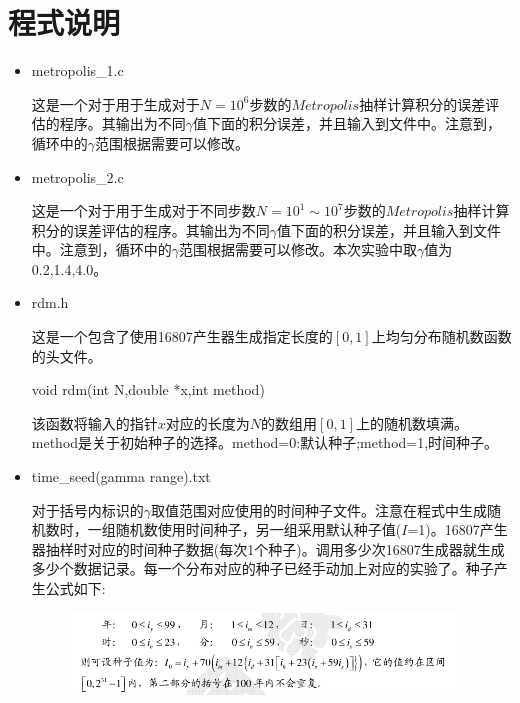 \documentclass[UTF8]{ctexart}
\begin{document}
	\section{程式说明}
	
		\begin{itemize}
			\item metropolis\_1.c
			
			这是一个对于用于生成对于$N=10^{6}$步数的$Metropolis$抽样计算积分的误差评估的程序。其输出为不同$\gamma$值下面的积分误差，并且输入到文件中。注意到，循环中的$\gamma$范围根据需要可以修改。
			
			\item metropolis\_2.c
			
			这是一个对于用于生成对于不同步数$N=10^{1}\sim10^{7}$步数的$Metropolis$抽样计算积分的误差评估的程序。其输出为不同$\gamma$值下面的积分误差，并且输入到文件中。注意到，循环中的$\gamma$范围根据需要可以修改。本次实验中取$\gamma$值为0.2,1.4,4.0。
			
			
			\item rdm.h
			
			这是一个包含了使用16807产生器生成指定长度的$[0,1]$上均匀分布随机数函数的头文件。
			
			\subitem void rdm(int N,double *x,int method)
			
			该函数将输入的指针$x$对应的长度为$N$的数组用$[0,1]$上的随机数填满。method是关于初始种子的选择。method=0:默认种子;method=1,时间种子。
			
			\item time\_seed(gamma range).txt
			
			对于括号内标识的$\gamma$取值范围对应使用的时间种子文件。注意在程式中生成随机数时，一组随机数使用时间种子，另一组采用默认种子值($I$=1)。16807产生器抽样时对应的时间种子数据(每次1个种子)。调用多少次16807生成器就生成多少个数据记录。每一个分布对应的种子已经手动加上对应的实验了。种子产生公式如下:
			
		
				
			\begin{figure}[H]
				\centering  %
				\includegraphics[width=4in]{1.png}
			\end{figure}
					
		\end{itemize}
	
\end{document}
